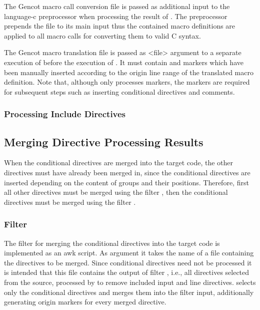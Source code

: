 The Gencot macro call conversion file is passed as additional input to the language-c preprocessor when
processing the result of . The preprocessor prepends the file to its main input thus 
the contained macro definitions are applied to all macro calls for converting them to valid C syntax.

The Gencot macro translation file is passed as <file> argument to a separate execution of 
before the execution of . It must contain  and 
markers which have been manually inserted according to the origin line range of the translated macro
definition. Note that, although  only processes  markers, the 
markers are required for subsequent steps such as inserting conditional directives and comments.

\subsubsection{Processing Include Directives}

\subsection{Merging Directive Processing Results}

When the conditional directives are merged into the target code, the other 
directives must have already been merged in, since the conditional directives are inserted depending on the content 
of groups and their positions. Therefore, first all other directives must be merged using the filter ,
then the conditional directives must be merged using the filter .

\subsubsection{Filter }

The filter for merging the conditional directives into the target code is implemented as an awk script. As argument
it takes the name of a file containing the directives to be merged. Since conditional directives need not be
processed it is intended that this file contains the output of filter , i.e., all directives
selected from the source, processed by  to remove included input and line directives. 
 selects only the conditional directives and merges them into
the filter input, additionally generating origin markers for every merged directive. 

